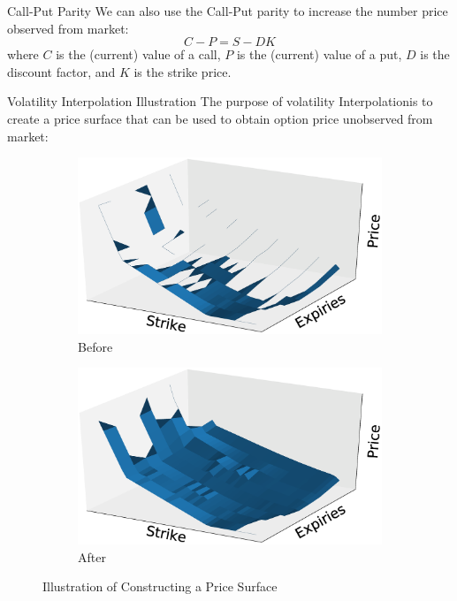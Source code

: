 \documentclass[10pt,table,mathserif]{beamer}
\begin{document}
\begin{frame}{Call-Put Parity}
We can also use the Call-Put parity to increase the number price observed from market:
\[
C-P=S-D K
\]
where $C$ is the (current) value of a call, $P$ is the (current) value of a put, $D$ is the discount factor, and $K$ is the strike price. 

\end{frame}

\begin{frame}{Volatility Interpolation Illustration}
The purpose of volatility Interpolation\footnotemark \;is to create a price surface that can be used to obtain option price unobserved from market:
\begin{figure}
	\begin{subfigure}[b]{0.49\textwidth}
		\includegraphics[width=\textwidth]{surf1}
		\caption{Before}
	\end{subfigure}
	\begin{subfigure}[b]{0.49\textwidth}
		\includegraphics[width=\textwidth]{surf2}
		\caption{After}
	\end{subfigure}
	\caption{Illustration of Constructing a Price Surface}
\end{figure}
\end{frame}
\end{document}
